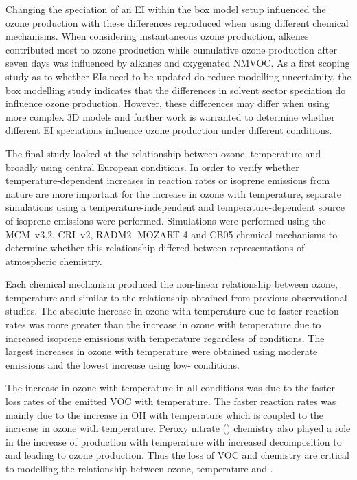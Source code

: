 Changing the speciation of an EI within the box model setup influenced the ozone production with these differences reproduced when using different chemical mechanisms.
When considering instantaneous ozone production, alkenes contributed most to ozone production while cumulative ozone production after seven days was influenced by alkanes and oxygenated NMVOC.
As a first scoping study as to whether EIs need to be updated do reduce modelling uncertainity, the box modelling study indicates that the differences in solvent sector speciation do influence ozone production.
However, these differences may differ when using more complex 3D models and further work is warranted to determine whether different EI speciations influence ozone production under different conditions.

The final study looked at the relationship between ozone, temperature and  broadly using central European conditions.
In order to verify whether temperature-dependent increases in reaction rates or isoprene emissions from nature are more important for the increase in ozone with temperature, separate simulations using a temperature-independent and temperature-dependent source of isoprene emissions were performed.
Simulations were performed using the MCM~v3.2, CRI~v2, RADM2, MOZART-4 and CB05 chemical mechanisms to determine whether this relationship differed between representations of atmospheric chemistry.

Each chemical mechanism produced the non-linear relationship between ozone, temperature and  similar to the relationship obtained from previous observational studies.
The absolute increase in ozone with temperature due to faster reaction rates was more greater than the increase in ozone with temperature due to increased isoprene emissions with temperature regardless of  conditions.
The largest increases in ozone with temperature were obtained using moderate  emissions and the lowest increase using low- conditions.

The increase in ozone with temperature in all  conditions was due to the faster loss rates of the emitted VOC with temperature.
The faster reaction rates was mainly due to the increase in OH with temperature which is coupled to the increase in ozone with temperature.
Peroxy nitrate () chemistry also played a role in the increase of  production with temperature with increased decomposition to  and  leading to ozone production.
Thus the loss of VOC and  chemistry are critical to modelling the relationship between ozone, temperature and .

